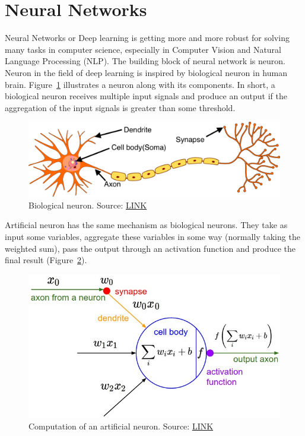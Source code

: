 \documentclass[12pt, sort&compress]{report}
\begin{document}
\section{Neural Networks}
Neural Networks or Deep learning is getting more and more robust for solving many tasks in computer science, especially in Computer Vision and Natural Language Processing (NLP). The building block of neural network is neuron. Neuron in the field of deep learning is inspired by biological neuron in human brain. Figure~\ref{fig:2:01} illustrates a neuron along with its components. In short, a biological neuron receives multiple input signals and produce an output if the aggregation of the input signals is greater than some threshold. 
\begin{figure}[!htbp]
	\centering
	\includegraphics[scale=.25]{images/biological_neuron.png}
	\caption{Biological neuron. Source: \href{https://smhatre59.medium.com/what-is-the-relation-between-artificial-and-biological-neuron-18b05831036}{LINK}}
	\label{fig:2:01}
\end{figure}
\par Artificial neuron has the same mechanism as biological neurons. They take as input  some variables, aggregate these variables in some way (normally taking the weighted sum), pass the output through an activation function and produce the final result (Figure~\ref{fig:2:02}).
\begin{figure}[!htbp]
	\centering
	\includegraphics[scale=0.4]{images/activation.jpg}
	\caption{Computation of an artificial neuron. Source: \href{https://ichi.pro/vi/chuc-nang-kich-hoat-tat-ca-nhung-gi-ban-can-biet-58662895551070}{LINK}}
	\label{fig:2:02}
\end{figure}
\end{document}
